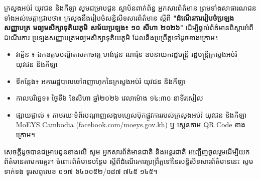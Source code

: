 ក្រសួងអប់រំ យុវជន និងកីឡា សូមជម្រាបជូន ស្ថាប័នពាក់ព័ន្ធ អ្នកសារព័ត៌មាន ព្រមទាំងសាធារណជន ទាំងអស់មេត្តាជ្រាបថា៖ ក្រសួងនឹងរៀបចំសន្និសីទសារព័ត៌មាន ស្តីពី \textbf{"ដំណើរការរៀបចំប្រឡងសញ្ញាបត្រ មធ្យមសិក្សាទុតិយភូមិ សម័យប្រឡង៖ ១០ សីហា ២០២៦"} ដើម្បីផ្តល់ព័ត៌មានពិស្តារអំពីដំណើរការ ប្រឡងសញ្ញាបត្រមធ្យមសិក្សាទុតិយភូមិ ដែលនឹងប្រព្រឹត្តទៅដូចខាងក្រោម៖
\begin{itemize}
    \setlength{\topsep}{0pt}
    \setlength{\partopsep}{0pt}
    \setlength{\itemsep}{0pt}
    \setlength{\parsep}{0pt}
    \item វាគ្មិន ៖ ឯកឧត្តមបណ្ឌិតសភាចារ្យ ហង់ជួន ណារ៉ុន ឧបនាយករដ្ឋមន្ត្រី រដ្ឋមន្ត្រីក្រសួងអប់រំ យុវជន និងកីឡា
    \item ទីកន្លែង៖ អគាររដ្ឋបាលចៅពញាហុកនៃក្រសួងអប់រំ យុវជន និងកីឡា
    \item កាលបរិច្ឆេទ៖ ថ្ងៃទី៦ ខែសីហា ឆ្នាំ២០២៦ វេលាម៉ោង ១៤:៣០ នាទីរសៀល
    \item ផ្សាយផ្ទាល់ ៖ តាមរយៈទំព័របណ្តាញសង្គមហ្វេសប៊ុកផ្លូវការរបស់ក្រសួងអប់រំ យុវជន និងកីឡា MoEYS Cambodia (facebook.com/moeys.gov.kh) ឬ ស្កេនតាម QR Code ខាងក្រោម។
\end{itemize}
សេចក្តីដូចបានជម្រាបជូនខាងលើ សូម អ្នកសារព័ត៌មានជាតិ និងអន្តរជាតិ អញ្ជើញចូលរួមដើម្បីយក ព័ត៌មានតាមការគួរ។ ចំពោះព័ត៌មានបន្ថែម ស្តីពីដំណើរការប្រព្រឹត្តទៅនៃសន្និសីទសារព័ត៌មាននេះ សូមទាក់ទង ទូរសព្ទលេខ ០១៧ ៦៤០០៥២/០៨៧ ៧៤៥ ១៤៥។
